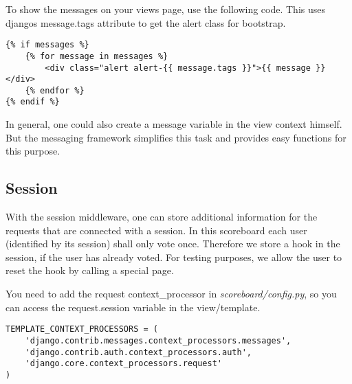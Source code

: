 To show the messages on your views page, use the following code. This uses djangos message.tags attribute to get the alert class for bootstrap.
\begin{lstlisting}[style=HTML, caption=index.html, label=lst:index.html1]
{% if messages %}
    {% for message in messages %}
        <div class="alert alert-{{ message.tags }}">{{ message }}</div>
    {% endfor %}
{% endif %}
\end{lstlisting}

In general, one could also create a message variable in the view context himself. But the messaging framework simplifies this task and provides easy functions for this purpose.

\subsection{Session}
\label{ssec:session}

With the session middleware, one can store additional information for the requests that are connected with a session. In this scoreboard each user (identified by its session) shall only vote once. Therefore we store a hook in the session, if the user has already voted. For testing purposes, we allow the user to reset the hook by calling a special page.

You need to add the request context\_processor in \emph{scoreboard/config.py}, so you can access the request.session variable in the view/template.
\begin{lstlisting}[style=Python, caption=webtech/config.py, label=lst:config.py1]
TEMPLATE_CONTEXT_PROCESSORS = (
    'django.contrib.messages.context_processors.messages',
    'django.contrib.auth.context_processors.auth',
    'django.core.context_processors.request'
)
\end{lstlisting}

